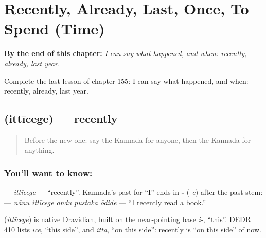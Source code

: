 
\chapter{Recently, Already, Last, Once, To Spend (Time)}
\label{ch:ka-recently-already-last-once-to-spend-time}

\begin{chapteropening}
\textbf{By the end of this chapter:} \emph{I can say what happened, and when: recently, already, last year.}

Complete the last lesson of chapter 155: I can say what happened, and when: recently, already, last year.
\end{chapteropening}

\section[\texorpdfstring{\kn{ಇತ್ತೀಚೆಗೆ} (ittīcege)}{ಇತ್ತೀಚೆಗೆ (ittīcege)}]{ (ittīcege) — recently}

\label{lesson:KA-C155-ittichege}



\begin{quote}
Before the new one: say the Kannada for anyone, then the Kannada for anything.
\end{quote}

\subsection*{You'll want to know: }
\textbf{} — \emph{ittīcege} — \textquotedblleft{}recently\textquotedblright{}. Kannada's past for \textquotedblleft{}I\textquotedblright{} ends in \textbf{-} (\emph{-e}) after the past stem: \textbf{    } — \emph{nānu ittīcege ondu pustaka ōdide} — \textquotedblleft{}I recently read a book.\textquotedblright{}

\begin{cousinweb}
\textbf{} (\emph{ittīcege}) is native Dravidian, built on the near-pointing base \emph{i-}, \textquotedblleft{}this\textquotedblright{}. DEDR 410 lists \emph{īce}, \textquotedblleft{}this side\textquotedblright{}, and \emph{itta}, \textquotedblleft{}on this side\textquotedblright{}: recently is \textquotedblleft{}on this side\textquotedblright{} of now.
\end{cousinweb}

